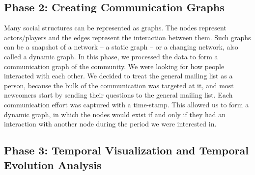 \documentclass[ifip]{svmult}
\begin{document}
\subsection{Phase 2: Creating Communication Graphs}

Many social structures can be represented as graphs. The nodes represent actors/players and the edges represent the interaction between them. Such graphs can be a snapshot of a network -- a static graph -- or a changing network, also called a dynamic graph. In this phase, we processed the data to form a communication graph of the community. We were looking for how people interacted with each other. We decided to treat the general mailing list as a person, because the bulk of the communication was targeted at it, and most newcomers start by sending their questions to the general mailing list. Each communication effort was captured with a time-stamp. This allowed us to form a dynamic graph, in which the nodes would exist if and only if they had an interaction with another node during the period we were interested in.

\subsection{Phase 3: Temporal Visualization and Temporal Evolution Analysis }
\end{document}
